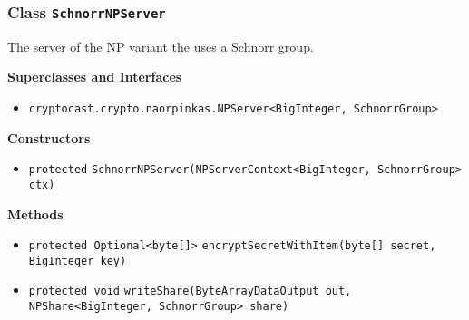 \subsubsection{Class \lstinline|SchnorrNPServer|}
The server of the NP variant the uses a Schnorr group. \\
\noindent\begin{minipage}[t]{5cm}
\vspace{0.3em}
\hspace*{2em}
\vspace{0.3em}
\end{minipage}



\textbf{\sffamily Superclasses and Interfaces}
\begin{itemize}
\item \lstinline|cryptocast.crypto.naorpinkas.NPServer<BigInteger, SchnorrGroup>|
\end{itemize}


\textbf{\sffamily Constructors}
\begin{itemize}
\item \lstinline|protected| \lstinline|SchnorrNPServer|\lstinline|(NPServerContext<BigInteger, SchnorrGroup> ctx)| \\[-0.6em]




\end{itemize}


\textbf{\sffamily Methods}
\begin{itemize}
\item \lstinline|protected Optional<byte[]>| \lstinline|encryptSecretWithItem|\lstinline|(byte[] secret, BigInteger key)| \\[-0.6em]




\item \lstinline|protected void| \lstinline|writeShare|\lstinline|(ByteArrayDataOutput out, NPShare<BigInteger, SchnorrGroup> share)| \\[-0.6em]




\end{itemize}

